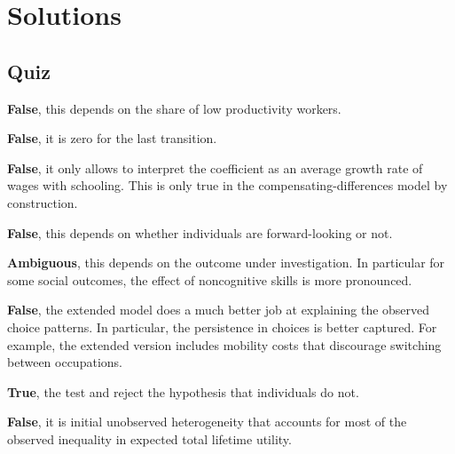 \FloatBarrier\section{Solutions}



\subsection{Quiz}

\begin{boenumerate}

\item \textbf{False}, this depends on the share of low productivity workers.

\item \textbf{False}, it is zero for the last transition.

\item \textbf{False}, it only allows to interpret the coefficient as an average growth rate of wages with schooling. This is only true in the compensating-differences model by construction.

\item \textbf{False}, this depends on whether individuals are forward-looking or not.

\item  \textbf{Ambiguous}, this depends on the outcome under investigation. In particular for some social outcomes, the effect of noncognitive skills is more pronounced.

\item  \textbf{False}, the extended model does a much better job at explaining the observed choice patterns. In particular, the persistence in choices is better captured. For example, the extended version includes mobility costs that discourage switching between occupations.

\item \textbf{True}, the test and reject the hypothesis that individuals do not.

\item \textbf{False}, it is initial unobserved heterogeneity that accounts for most of the observed inequality in expected total lifetime utility.


\end{boenumerate}
